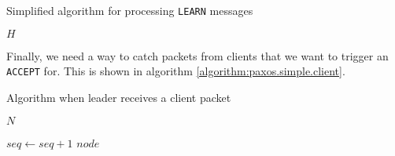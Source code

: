 \begin{algorithm}[H]
  \caption{Simplified algorithm for processing \texttt{LEARN} messages}
  \label{algorithm:paxos.simple.learner}
  \begin{algorithmic}
    \State $H$ 
    \State

          \State {}
        \EndForIn
      \EndIf
    \EndOn
  \end{algorithmic}
\end{algorithm}

Finally, we need a way to catch packets from clients that we want to trigger
an \texttt{ACCEPT} for.  This is shown in algorithm
\ref{algorithm:paxos.simple.client}.

\begin{algorithm}[H]
  \caption{Algorithm when leader receives a client packet}
  \label{algorithm:paxos.simple.client}
  \begin{algorithmic}
    \State $N$
    \State

      \State $seq \gets seq + 1$ 
        \State {}
                      {$node$}
      \EndForIn
    \EndOn
  \end{algorithmic}
\end{algorithm}


